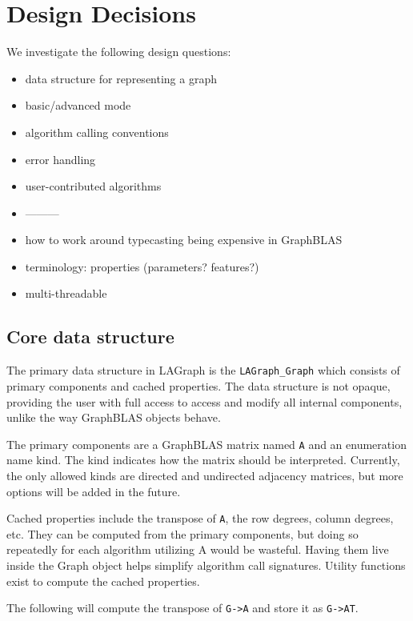 \section{Design Decisions}
\label{sec:decisions}


We investigate the following design questions:

\begin{itemize}
    \item data structure for representing a graph
    \item basic/advanced mode
    \item algorithm calling conventions
    \item error handling
    \item user-contributed algorithms
    \item ---------
    \item how to work around typecasting being expensive in GraphBLAS
    \item terminology: properties (parameters? features?)
    \item multi-threadable
\end{itemize}


\subsection{Core data structure}
The primary data structure in LAGraph is the \verb'LAGraph_Graph' which consists of primary components and cached properties.
The data structure is not opaque, providing the user with full access to access and modify all internal components,
unlike the way GraphBLAS objects behave.

The primary components are a GraphBLAS matrix named \verb'A' and an enumeration name kind. The kind indicates how the matrix
should be interpreted. Currently, the only allowed kinds are directed and undirected adjacency matrices, but more
options will be added in the future.

Cached properties include the transpose of \verb'A', the row degrees, column degrees, etc. They can be computed from the
primary components, but doing so repeatedly for each algorithm utilizing A would be wasteful. Having them live inside
the Graph object helps simplify algorithm call signatures. Utility functions exist to compute the cached properties.

The following will compute the transpose of \verb'G->A' and store it as \verb'G->AT'.

